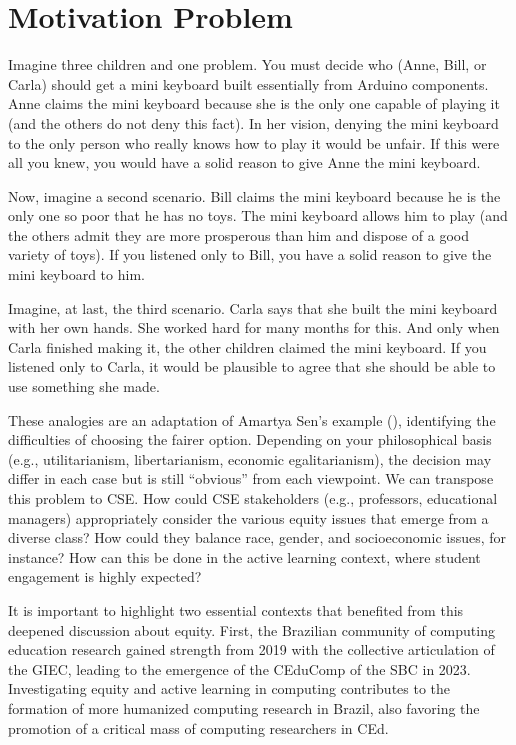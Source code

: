 \section{Motivation Problem}
\label{intro-sec:mot-prob}

Imagine three children and one problem. You must decide who (Anne, Bill, or Carla) should get a mini keyboard built essentially from Arduino components. Anne claims the mini keyboard because she is the only one capable of playing it (and the others do not deny this fact). In her vision, denying the mini keyboard to the only person who really knows how to play it would be unfair. If this were all you knew, you would have a solid reason to give Anne the mini keyboard. 

Now, imagine a second scenario. Bill claims the mini keyboard because he is the only one so poor that he has no toys. The mini keyboard allows him to play (and the others admit they are more prosperous than him and dispose of a good variety of toys). If you listened only to Bill, you have a solid reason to give the mini keyboard to him. 

Imagine, at last, the third scenario. Carla says that she built the mini keyboard with her own hands. She worked hard for many months for this. And only when Carla finished making it, the other children claimed the mini keyboard. If you listened only to Carla, it would be plausible to agree that she should be able to use something she made.

These analogies are an adaptation of Amartya Sen’s example (\citeyear{sen:2009}), identifying the difficulties of choosing the fairer option. Depending on your philosophical basis (e.g., utilitarianism, libertarianism, economic egalitarianism), the decision may differ in each case but is still ``obvious'' from each viewpoint. We can transpose this problem to \acrfull{CSE}. How could \gls{CSE} stakeholders (e.g., professors, educational managers) appropriately consider the various equity issues that emerge from a diverse class? How could they balance race, gender, and socioeconomic issues, for instance? How can this be done in the active learning context, where student engagement is highly expected?

It is important to highlight two essential contexts that benefited from this deepened discussion about equity. First, the Brazilian community of computing education research gained strength from 2019 with the collective articulation of the \gls{GIEC}, leading to the emergence of the \gls{CEduComp} of the \gls{SBC} in 2023. Investigating equity and active learning in computing contributes to the formation of more humanized computing research in Brazil, also favoring the promotion of a critical mass of computing researchers in \acrfull{CEd}.


